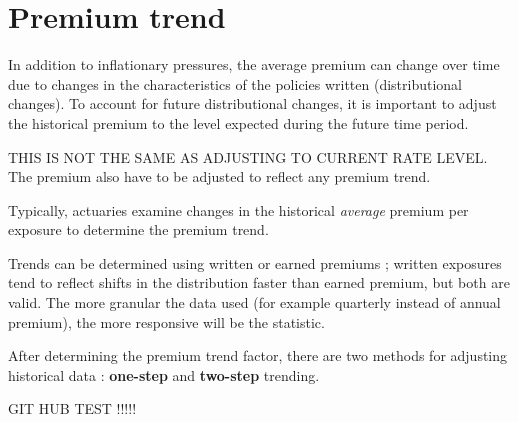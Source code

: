 \documentclass[11pt, english]{memoir}
\numberwithin{definition}{section}
\begin{document}
	\section{Premium trend}
	In addition to inflationary pressures, the average premium can change over time due to changes in the characteristics of the policies written (distributional changes). To account for future distributional changes, it is important to adjust the historical premium to the level expected during the future time period. 
	
	THIS IS NOT THE SAME AS ADJUSTING TO CURRENT RATE LEVEL. The premium also have to be adjusted to reflect any premium trend. 
	
	Typically, actuaries examine changes in the historical \emph{average} premium per exposure to determine the premium trend. 
	
	Trends can be determined using written or earned premiums ; written exposures tend to reflect shifts in the distribution faster than earned premium, but both are valid. The more granular the data used (for example quarterly instead of annual premium), the more responsive will be the statistic. 
	
	After determining the premium trend factor, there are two methods for adjusting historical data : \textbf{one-step} and \textbf{two-step} trending. 
	
	
	
	
	
	
	
	
	
	GIT HUB TEST !!!!!
	
	
	
	
	
	
	
	
	
	
	
	
	
	
	
	
	
	
	
	
	
	
	
	
	
	
	
	
	
	
\end{document}
